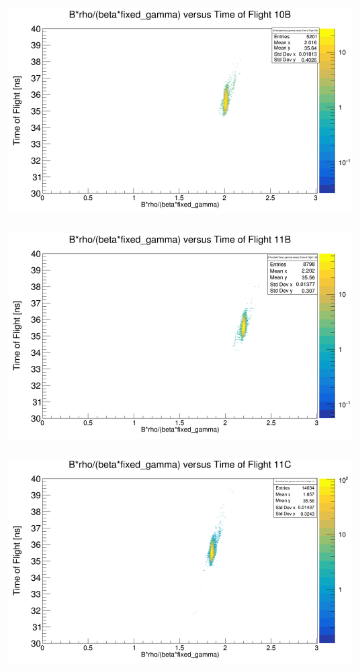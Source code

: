 \documentclass[12pt, letterpaper]{article}
\begin{document}
\begin{figure}[!htbp]
\begin{subfigure}{.5\textwidth}
  \centering
  \includegraphics[width=.9\linewidth]{brho_b_fix_g_10b.png}  
  \caption{}
  \label{fig:sub-first}
\end{subfigure}
\begin{subfigure}{.5\textwidth}
  \centering
  \includegraphics[width=.9\linewidth]{brho_b_fix_g_11b.png} 
  \caption{}
  \label{fig:sub-second}
\end{subfigure}
\begin{subfigure}{.5\textwidth}
  \centering
  \includegraphics[width=.9\linewidth]{brho_b_fix_g_11c.png} 

\end{subfigure}
\end{figure}
\end{document}
